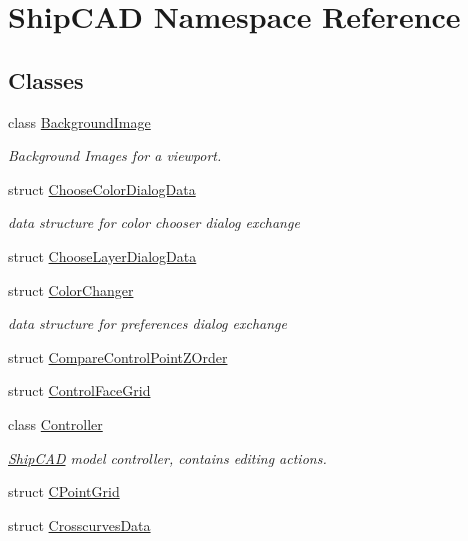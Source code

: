 \hypertarget{namespaceShipCAD}{}\section{Ship\+C\+AD Namespace Reference}
\label{namespaceShipCAD}
\subsection*{Classes}
\begin{DoxyCompactItemize}
\item 
class \hyperlink{classShipCAD_1_1BackgroundImage}{Background\+Image}
\begin{DoxyCompactList}\small\item\em Background Images for a viewport. \end{DoxyCompactList}\item 
struct \hyperlink{structShipCAD_1_1ChooseColorDialogData}{Choose\+Color\+Dialog\+Data}
\begin{DoxyCompactList}\small\item\em data structure for color chooser dialog exchange \end{DoxyCompactList}\item 
struct \hyperlink{structShipCAD_1_1ChooseLayerDialogData}{Choose\+Layer\+Dialog\+Data}
\item 
struct \hyperlink{structShipCAD_1_1ColorChanger}{Color\+Changer}
\begin{DoxyCompactList}\small\item\em data structure for preferences dialog exchange \end{DoxyCompactList}\item 
struct \hyperlink{structShipCAD_1_1CompareControlPointZOrder}{Compare\+Control\+Point\+Z\+Order}
\item 
struct \hyperlink{structShipCAD_1_1ControlFaceGrid}{Control\+Face\+Grid}
\item 
class \hyperlink{classShipCAD_1_1Controller}{Controller}
\begin{DoxyCompactList}\small\item\em \hyperlink{namespaceShipCAD}{Ship\+C\+AD} model controller, contains editing actions. \end{DoxyCompactList}\item 
struct \hyperlink{structShipCAD_1_1CPointGrid}{C\+Point\+Grid}
\item 
struct \hyperlink{structShipCAD_1_1CrosscurvesData}{Crosscurves\+Data}
\item 

\end{DoxyCompactItemize}
